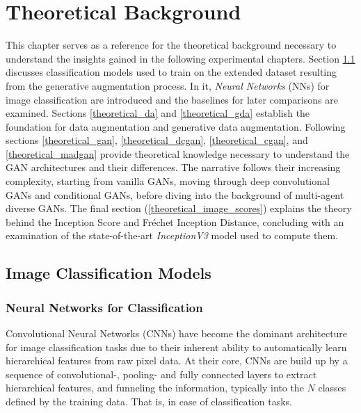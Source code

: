 \section{Theoretical Background}\label{body_theoretical_background}
This chapter serves as a reference for the theoretical background necessary to understand the insights gained in the following experimental chapters.
Section \ref{theoretical_classification} discusses classification models used to train on the extended dataset resulting from the generative augmentation process. In it, \textit{Neural Networks} (NNs) for image classification are introduced and the baselines for later comparisons are examined.
Sections \ref{theoretical_da} and \ref{theoretical_gda} establish the foundation for data augmentation and generative data augmentation.
Following sections \ref{theoretical_gan}, \ref{theoretical_dcgan}, \ref{theoretical_cgan}, and \ref{theoretical_madgan} provide theoretical knowledge necessary to understand the GAN architectures and their differences. The narrative follows their increasing complexity, starting from vanilla GANs, moving through deep convolutional GANs and conditional GANs, before diving into the background of multi-agent diverse GANs.
The final section (\ref{theoretical_image_scores}) explains the theory behind the Inception Score and Fréchet Inception Distance, concluding with an examination of the state-of-the-art \textit{InceptionV3} model used to compute them.
\subsection{Image Classification Models}\label{theoretical_classification}
\subsubsection{Neural Networks for Classification}
Convolutional Neural Networks (CNNs) have become the dominant architecture for image classification tasks due to their inherent ability to automatically learn hierarchical features from raw pixel data. At their core, CNNs are build up by a sequence of convolutional-, pooling- and fully connected layers to extract hierarchical features, and funneling the information, typically into the \(N\) classes defined by the training data. That is, in case of classification tasks. 

